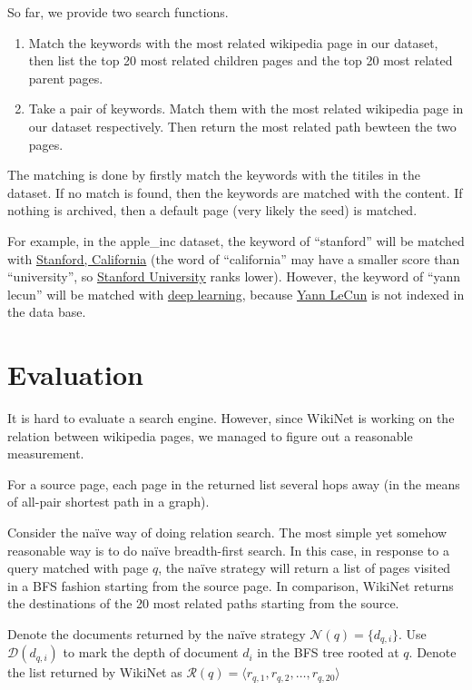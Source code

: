 \documentclass[12pt]{amsart}
\newcommand{\0}{\mat{0}}
\newcommand{\1}{\mathds{1}}
\begin{document}
So far, we provide two search functions. 
\begin{enumerate}[label=\arabic*.]
\item Match the keywords with the most related wikipedia page in our dataset, then list the top 20 most related children pages and the top 20 most related parent pages.
\item Take a pair of keywords. Match them with the most related wikipedia page in our dataset respectively. Then return the most related path bewteen the two pages. 
\end{enumerate}
The matching is done by firstly match the keywords with the titiles in the dataset. If no match is found, then the keywords are matched with the content. If nothing is archived, then a default page (very likely the seed) is matched. 

For example, in the apple\_inc dataset, the keyword of ``stanford'' will be matched with \href{https://en.wikipedia.org/wiki/Stanford,\_California}{Stanford, California} (the word of ``california'' may have a smaller score than ``university'', so \href{https://en.wikipedia.org/wiki/Stanford\_University}{Stanford University} ranks lower). However, the keyword of ``yann lecun'' will be matched with \href{https://en.wikipedia.org/wiki/Deep\_learning}{deep learning}, because \href{https://en.wikipedia.org/wiki/Yann\_LeCun}{Yann LeCun} is not indexed in the data base. 

\section{Evaluation}
\label{sec:eva}
It is hard to evaluate a search engine. However, since WikiNet is working on the relation between wikipedia pages, we managed to figure out a reasonable measurement. 

For a source page, each page in the returned list several hops away (in the means of all-pair shortest path in a graph).  

Consider the na\"ive way of doing relation search. The most simple yet somehow reasonable way is to do na\"ive breadth-first search. In this case, in response to a query matched with page $q$, the na\"ive strategy will return a list of pages visited in a BFS fashion starting from the source page. 
In comparison, WikiNet returns the destinations of the 20 most related paths starting from the source. 

Denote the documents returned by the na\"ive strategy $ \mathcal{N}(q)=\{d_{q,i}\} $. Use $\mathcal{D}(d_{q,i})$  to mark the depth of document $d_i$ in the BFS tree rooted at $q$. Denote the list returned by WikiNet as $\mathcal{R}(q)=\langle r_{q,1},r_{q,2},\dots, r_{q,20}\rangle$
\end{document}
